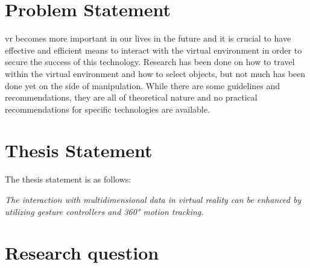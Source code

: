
\section{Problem Statement}

\gls{vr} becomes more important in our lives in the future and it is crucial to have effective and efficient means to interact with the virtual environment in order to secure the success of this technology. Research has been done on how to travel within the virtual environment and how to select objects, but not much has been done yet on the side of manipulation. While there are some guidelines and recommendations, they are all of theoretical nature and no practical recommendations for specific technologies are available.



\section{Thesis Statement}

The thesis statement is as follows:
\begin{framed}
	\textit{The interaction with multidimensional data in virtual reality can be enhanced by utilizing gesture controllers and 360° motion tracking.}
\end{framed} \label{TS}



\section{Research question}

